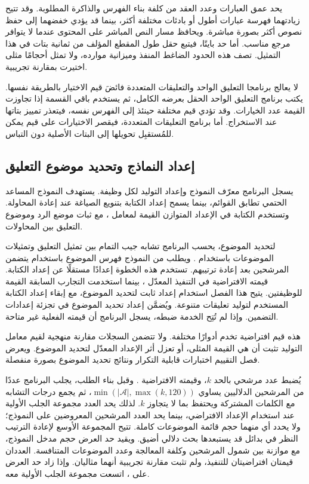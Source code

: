 يحد عمق العبارات وعدد العقد من كلفة بناء الفهرس والذاكرة المطلوبة. وقد تتيح زيادتهما فهرسة عبارات أطول أو بادئات مختلفة أكثر، بينما قد يؤدي خفضهما إلى حفظ نصوص أكثر بصورة مباشرة. ويحافظ مسار النص المباشر على المحتوى عندما لا يتوافر مرجع مناسب. أما حد  بايتًا، فيتبع حقل طول المقطع المؤلف من ثمانية بتات في هذا التمثيل. تصف هذه الحدود الضاغط المنفذ وميزانية موارده، ولا تمثل أحجامًا مثلى اختيرت بمقارنة تجريبية.

لا يعالج برنامجا التعليق الواحد والتعليقات المتعددة فائضَ قيم الاختيار بالطريقة نفسها.
يكتب برنامج التعليق الواحد الحقل بعرضه الكامل، ثم يستخدم باقي القسمة إذا تجاوزت القيمة عدد الخيارات. وقد تؤدي قيم مختلفة حينئذ إلى الفهرس نفسه، فيتعذر تمييز بتاتها عند الاستخراج.
أما برنامج التعليقات المتعددة، فيقصر الاختيارات على قيم يمكن للمُستقبِل تحويلها إلى البتات الأصلية دون التباس.

\subsection{إعداد النماذج وتحديد موضوع التعليق}
\label{sec:model-settings}
يسجل البرنامج معرّف النموذج وإعداد التوليد لكل وظيفة. يستهدف النموذج المساعد الحتمي تطابق القوائم، بينما يسمح إعداد الكتابة بتنويع الصياغة عند إعادة المحاولة.
وتستخدم الكتابة في الإعداد المتوازن القيمة  لمعامل ، مع ثبات موضع الرد وموضوع التعليق بين المحاولات.

لتحديد الموضوع، يحسب البرنامج تشابه جيب التمام بين تمثيل التعليق وتمثيلات الموضوعات باستخدام .
ويطلب من النموذج فهرس الموضوع باستخدام  يتضمن المرشحين بعد إعادة ترتيبهم.
تستخدم هذه الخطوة إعدادًا مستقلًا عن إعداد الكتابة. قيمته الافتراضية في التنفيذ المعدّل ، بينما استخدمت التجارب السابقة القيمة  للوظيفتين.
يتيح هذا الفصل استخدام إعداد ثابت لتحديد الموضوع، مع إبقاء إعداد الكتابة المستخدم لتوليد تعليقات متنوعة.
ويُضمَّن إعداد تحديد الموضوع في تجزئة إعدادات التضمين. وإذا لم تُتِح الخدمة ضبطه، يسجل البرنامج أن قيمته الفعلية غير متاحة.

هذه قيم افتراضية تخدم أدوارًا مختلفة. ولا تتضمن السجلات مقارنة منهجية لقيم معامل التوليد تثبت أن  هي القيمة المثلى، أو تعزل أثر الإعداد المعدّل لتحديد الموضوع. ويعرض فصل التقييم اختبارات قابلية التكرار ونتائج تحديد الموضوع بصورة منفصلة.

يُضبط عدد مرشحي  بالحد $k$، وقيمته الافتراضية . وقبل بناء الطلب، يجلب البرنامج عددًا من المرشحين الدلاليين يساوي $\min(|\mathcal{A}|,\max(k,120))$، ثم يجمع درجات التشابه مع الكلمات المشتركة ويحتفظ بما لا يتجاوز $k$. لذلك يحد العدد  مجموعة الجلب الأولية عند استخدام الإعداد الافتراضي، بينما يحد العدد  المرشحين المعروضين على النموذج؛ ولا يحدد أي منهما حجم قائمة الموضوعات كاملة. تتيح المجموعة الأوسع لإعادة الترتيب النظر في بدائل قد يستبعدها بحث دلالي أضيق. ويقيد حد العرض حجم مدخل النموذج، مع موازنة بين شمول المرشحين وكلفة المعالجة وعدد الموضوعات المتنافسة. العددان قيمتان افتراضيتان للتنفيذ، ولم تثبت مقارنة تجريبية أنهما مثاليان. وإذا زاد حد العرض على ، اتسعت مجموعة الجلب الأولية معه.

